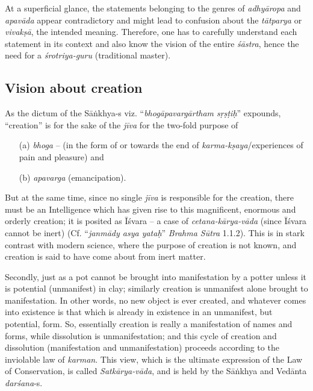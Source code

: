 At a superﬁcial glance, the statements belonging to the genres of {\sl adhyāropa} and {\sl apavāda} appear contradictory and might lead to confusion about the {\sl tātparya} or {\sl vivakṣā}, the intended meaning. Therefore, one has to carefully understand each statement in its context and also know the vision of the entire {\sl śāstra}, hence the need for a {\sl śrotriya-guru} (traditional master).\\[-20pt]

\subsection{Vision about creation}\label{art12-sec2.3}

As the dictum of the Sāṅkhya-s viz. ``{\sl bhogāpavargārtham sṛṣṭiḥ}'' expounds, ``creation'' is for the sake of the {\sl jīva} for the two-fold purpose of 
\begin{itemize}
\itemsep=0pt
\item[(a)] {\sl bhoga} -- (in the form of or towards the end of {\sl karma-kṣaya}/experiences of pain and pleasure) and 

\item[(b)] {\sl apavarga} (emancipation). 
\end{itemize}
But at the same time, since no single {\sl jīva} is responsible for the creation, there must be an Intelligence which has given rise to this magniﬁcent, enormous and orderly creation; it is posited as Īśvara -- a case of {\sl cetana-kārya-vāda} (since Īśvara cannot be inert) (Cf. ``{\sl janmādy asya yataḥ}'' {\sl Brahma Sūtra} 1.1.2). This is in stark contrast with modern science, where the purpose of creation is not known, and creation is said to have come about from inert matter. 

Secondly, just as a pot cannot be brought into manifestation by a potter unless it is potential (unmanifest) in clay; similarly creation is unmanifest alone brought to manifestation. In other words, no new object is ever created, and whatever comes into existence is that which is already in existence in an unmanifest, but potential, form. So, essentially creation is really a manifestation of names and forms, while dissolution is unmanifestation; and this cycle of creation and dissolution (manifestation and unmanifestation) proceeds according to the inviolable law of {\sl karman}. This view, which is the ultimate expression of the Law of Conservation, is called {\sl Satkārya-vāda}, and is held by the Sāṅkhya and Vedānta {\sl darśana}-s.\\[-20pt]


